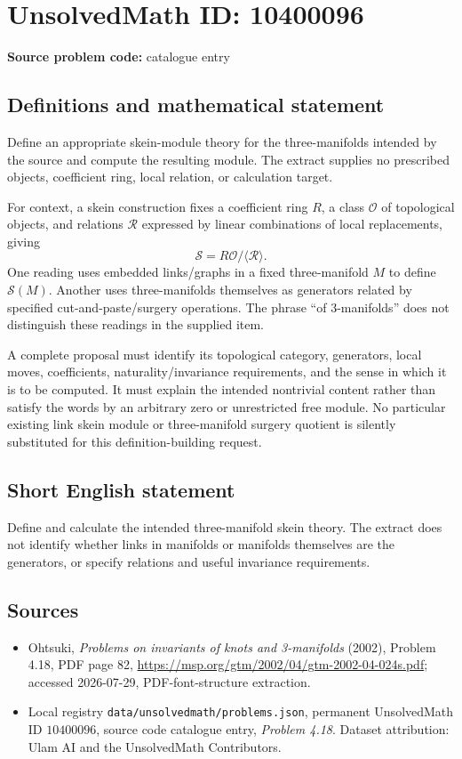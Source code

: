 \documentclass[11pt]{article}
\begin{document}
\section*{UnsolvedMath ID: 10400096}
\textbf{Source problem code:} catalogue entry
\subsection{Definitions and mathematical statement}
Define an appropriate skein-module theory for the three-manifolds intended by the source and compute the resulting module. The extract supplies no prescribed objects, coefficient ring, local relation, or calculation target.

For context, a skein construction fixes a coefficient ring $R$, a class $\mathcal O$ of topological objects, and relations $\mathcal R$ expressed by linear combinations of local replacements, giving
\[
\mathcal S=R\mathcal O/\langle\mathcal R\rangle.
\]
One reading uses embedded links/graphs in a fixed three-manifold $M$ to define $\mathcal S(M)$. Another uses three-manifolds themselves as generators related by specified cut-and-paste/surgery operations. The phrase ``of 3-manifolds'' does not distinguish these readings in the supplied item.

A complete proposal must identify its topological category, generators, local moves, coefficients, naturality/invariance requirements, and the sense in which it is to be computed. It must explain the intended nontrivial content rather than satisfy the words by an arbitrary zero or unrestricted free module. No particular existing link skein module or three-manifold surgery quotient is silently substituted for this definition-building request.
\subsection{Short English statement}
Define and calculate the intended three-manifold skein theory. The extract does not identify whether links in manifolds or manifolds themselves are the generators, or specify relations and useful invariance requirements.
\subsection{Sources}
\begin{itemize}
\item Ohtsuki, \emph{Problems on invariants of knots and 3-manifolds} (2002), Problem 4.18, PDF page 82, \url{https://msp.org/gtm/2002/04/gtm-2002-04-024s.pdf}; accessed 2026-07-29, PDF-font-structure extraction.
\item Local registry \texttt{data/unsolvedmath/problems.json}, permanent UnsolvedMath ID $10400096$, source code catalogue entry, \emph{Problem 4.18}. Dataset attribution: Ulam AI and the UnsolvedMath Contributors.
\end{itemize}
\end{document}
